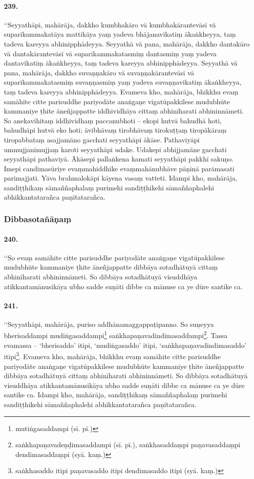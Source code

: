 \paragraph{239.} ‘‘Seyyathāpi, mahārāja, dakkho kumbhakāro vā kumbhakārantevāsī vā suparikammakatāya mattikāya yaṃ yadeva bhājanavikatiṃ ākaṅkheyya, taṃ tadeva kareyya abhinipphādeyya. Seyyathā vā pana, mahārāja, dakkho dantakāro vā dantakārantevāsī vā suparikammakatasmiṃ dantasmiṃ yaṃ yadeva dantavikatiṃ ākaṅkheyya, taṃ tadeva kareyya abhinipphādeyya. Seyyathā vā pana, mahārāja, dakkho suvaṇṇakāro vā suvaṇṇakārantevāsī vā suparikammakatasmiṃ suvaṇṇasmiṃ yaṃ yadeva suvaṇṇavikatiṃ ākaṅkheyya, taṃ tadeva kareyya abhinipphādeyya. Evameva kho, mahārāja, bhikkhu evaṃ samāhite citte parisuddhe pariyodāte anaṅgaṇe vigatūpakkilese mudubhūte kammaniye ṭhite āneñjappatte iddhividhāya cittaṃ abhinīharati abhininnāmeti. So anekavihitaṃ iddhividhaṃ paccanubhoti – ekopi hutvā bahudhā hoti, bahudhāpi hutvā eko hoti; āvibhāvaṃ tirobhāvaṃ tirokuṭṭaṃ tiropākāraṃ tiropabbataṃ asajjamāno gacchati seyyathāpi ākāse. Pathaviyāpi ummujjanimujjaṃ karoti seyyathāpi udake. Udakepi abhijjamāne gacchati seyyathāpi pathaviyā. Ākāsepi pallaṅkena kamati seyyathāpi pakkhī sakuṇo. Imepi candimasūriye evaṃmahiddhike evaṃmahānubhāve pāṇinā parāmasati parimajjati. Yāva brahmalokāpi kāyena vasaṃ vatteti. Idampi kho, mahārāja, sandiṭṭhikaṃ sāmaññaphalaṃ purimehi sandiṭṭhikehi sāmaññaphalehi abhikkantatarañca paṇītatarañca.

\subsubsection{Dibbasotañāṇaṃ}

\paragraph{240.} ‘‘So evaṃ samāhite citte parisuddhe pariyodāte anaṅgaṇe vigatūpakkilese mudubhūte kammaniye ṭhite āneñjappatte dibbāya sotadhātuyā cittaṃ abhinīharati abhininnāmeti. So dibbāya sotadhātuyā visuddhāya atikkantamānusikāya ubho sadde suṇāti dibbe ca mānuse ca ye dūre santike ca.

\paragraph{241.} ‘‘Seyyathāpi, mahārāja, puriso addhānamaggappaṭipanno. So suṇeyya bherisaddampi mudiṅgasaddampi\footnote{mutiṅgasaddampi (sī. pī.)} saṅkhapaṇavadindimasaddampi\footnote{saṅkhapaṇavadeṇḍimasaddampi (sī. pī.), saṅkhasaddaṃpi paṇavasaddaṃpi dendimasaddaṃpi (syā. kaṃ.)}. Tassa evamassa – ‘bherisaddo’ itipi, ‘mudiṅgasaddo’ itipi, ‘saṅkhapaṇavadindimasaddo’ itipi\footnote{saṅkhasaddo itipi paṇavasaddo itipi dendimasaddo itipi (syā. kaṃ.)}. Evameva kho, mahārāja, bhikkhu evaṃ samāhite citte parisuddhe pariyodāte anaṅgaṇe vigatūpakkilese mudubhūte kammaniye ṭhite āneñjappatte dibbāya sotadhātuyā cittaṃ abhinīharati abhininnāmeti. So dibbāya sotadhātuyā visuddhāya atikkantamānusikāya ubho sadde suṇāti dibbe ca mānuse ca ye dūre santike ca. Idampi kho, mahārāja, sandiṭṭhikaṃ sāmaññaphalaṃ purimehi sandiṭṭhikehi sāmaññaphalehi abhikkantatarañca paṇītatarañca.


